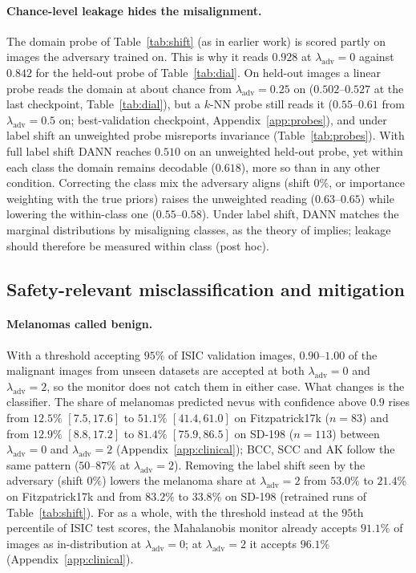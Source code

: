 \documentclass{midl}
\newcommand{\lam}{\lambda_{\mathrm{adv}}}
\begin{document}
\paragraph{Chance-level leakage hides the misalignment.} The domain probe of
Table~\ref{tab:shift} (as in earlier work) is scored partly on images the adversary trained on.
This is why it reads $0.928$ at $\lam=0$ against $0.842$ for the held-out probe of Table~\ref{tab:dial}. On held-out images
a linear probe reads the domain at about chance from $\lam=0.25$ on ($0.502$--$0.527$ at the
last checkpoint, Table~\ref{tab:dial}), but a $k$-NN probe still reads it ($0.55$--$0.61$ from
$\lam=0.5$ on; best-validation checkpoint, Appendix~\ref{app:probes}), and under label shift an unweighted probe misreports
invariance (Table~\ref{tab:probes}). With full label shift DANN reaches $0.510$ on an
unweighted held-out probe, yet within each class the domain remains decodable ($0.618$),
more so than in any other condition. Correcting the class mix the adversary aligns (shift
$0\%$, or importance weighting with the true priors) raises the unweighted reading
($0.63$--$0.65$) while lowering the within-class one ($0.55$--$0.58$). Under label shift,
DANN matches the marginal distributions by misaligning classes, as the theory of
\citet{zhao2019invariant} implies; leakage should therefore be measured within class
(post hoc).

\subsection{Safety-relevant misclassification and mitigation}
\label{sec:confidently}
\label{sec:adversarial}

\paragraph{Melanomas called benign.} With a threshold accepting $95\%$ of ISIC validation
images, $0.90$--$1.00$ of the malignant images from unseen datasets are accepted at both
$\lam=0$ and $\lam=2$, so the monitor does not catch them in either case. What changes is the
classifier. The share of melanomas predicted nevus with confidence above $0.9$ rises from
$12.5\%$ $[7.5, 17.6]$ to $51.1\%$ $[41.4, 61.0]$ on Fitzpatrick17k ($n=83$) and from $12.9\%$
$[8.8, 17.2]$ to $81.4\%$ $[75.9, 86.5]$ on SD-198 ($n=113$) between $\lam=0$ and $\lam=2$
(Appendix~\ref{app:clinical}); BCC, SCC and AK follow the same pattern ($50$--$87\%$ at
$\lam=2$). Removing the label shift seen by the adversary (shift $0\%$) lowers the melanoma
share at $\lam=2$ from $53.0\%$ to $21.4\%$ on Fitzpatrick17k and from $83.2\%$ to $33.8\%$
on SD-198 (retrained runs of Table~\ref{tab:shift}).
For \texttt{} as a whole, with the threshold instead at the $95$th percentile of ISIC test
scores, the Mahalanobis monitor already accepts $91.1\%$ of images as in-distribution at $\lam=0$; at $\lam=2$ it accepts $96.1\%$ (Appendix~\ref{app:clinical}).
\end{document}
